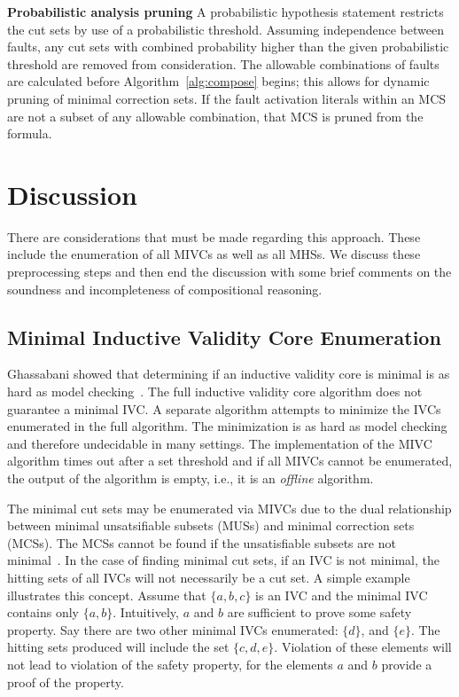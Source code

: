 \textbf{Probabilistic analysis pruning} A probabilistic hypothesis statement restricts the cut sets by use of a probabilistic threshold. Assuming independence between faults, any cut sets with combined probability higher than the given probabilistic threshold are removed from consideration. The allowable combinations of faults are calculated before Algorithm~\ref{alg:compose} begins; this allows for dynamic pruning of minimal correction sets. If the fault activation literals within an MCS are not a subset of any allowable combination, that MCS is pruned from the formula. 

\section{Discussion}
\label{sec:disc}
There are considerations that must be made regarding this approach. These include the enumeration of all MIVCs as well as all MHSs. We discuss these preprocessing steps and then end the discussion with some brief comments on the soundness and incompleteness of compositional reasoning. 

\subsection{Minimal Inductive Validity Core Enumeration}
Ghassabani showed that determining if an inductive validity core is minimal is as hard as model checking~\cite{ghassabani_2018, Ghassabani2017EfficientGO}. The full inductive validity core algorithm does not guarantee a minimal IVC. A separate algorithm attempts to minimize the IVCs enumerated in the full algorithm. The minimization is as hard as model checking and therefore undecidable in many settings. The implementation of the MIVC algorithm times out after a set threshold and if all MIVCs cannot be enumerated, the output of the algorithm is empty, i.e., it is an {\em offline} algorithm. 

The minimal cut sets may be enumerated via MIVCs due to the dual relationship between minimal unsatsifiable subsets (MUSs) and minimal correction sets (MCSs). The MCSs cannot be found if the unsatisfiable subsets are not minimal~\cite{liffiton2016fast}. In the case of finding minimal cut sets, if an IVC is not minimal, the hitting sets of all IVCs will not necessarily be a cut set. A simple example illustrates this concept. Assume that $\{a,b,c\}$ is an IVC and the minimal IVC contains only $\{a,b\}$. Intuitively, $a$ and $b$ are sufficient to prove some safety property. Say there are two other minimal IVCs enumerated: $\{d\}$, and $\{e\}$.  The hitting sets produced will include the set $\{c, d, e\}$. Violation of these elements will not lead to violation of the safety property, for the elements $a$ and $b$ provide a proof of the property. 

